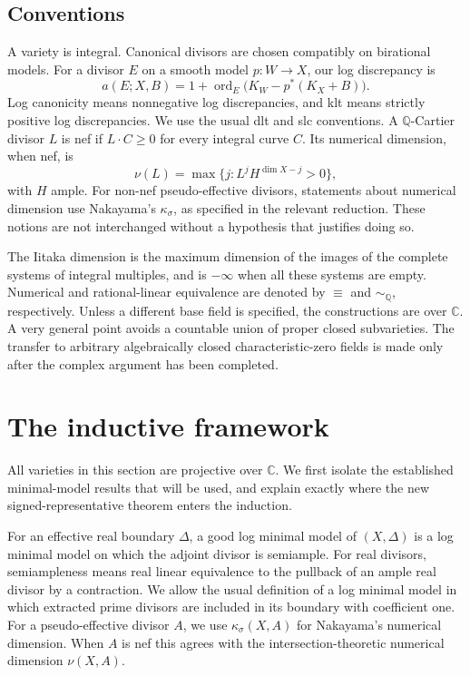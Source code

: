 \documentclass[11pt,letterpaper]{article}
\newcommand{\Q}{\mathbb{Q}}
\newcommand{\C}{\mathbb{C}}
\DeclareMathOperator{\ord}{ord}
\theoremstyle{definition}
\theoremstyle{remark}
\begin{document}
\subsection{Conventions}

A variety is integral. Canonical divisors are chosen compatibly on
birational models. For a divisor \(E\) on a smooth model
\(p:W\to X\), our log discrepancy is
\[
 a(E;X,B)=1+\ord_E\bigl(K_W-p^*(K_X+B)\bigr).
\]
Log canonicity means nonnegative log discrepancies, and klt means
strictly positive log discrepancies. We use the usual dlt and slc
conventions. A \(\Q\)-Cartier divisor \(L\) is nef if \(L\cdot C\ge0\)
for every integral curve \(C\). Its numerical dimension, when nef, is
\[
 \nu(L)=\max\{j: L^jH^{\dim X-j}>0\},
\]
with \(H\) ample. For non-nef pseudo-effective divisors, statements
about numerical dimension use Nakayama's \(\kappa_\sigma\), as
specified in the relevant reduction. These notions are not
interchanged without a hypothesis that justifies doing so.

The Iitaka dimension is the maximum dimension of the images of the
complete systems of integral multiples, and is \(-\infty\) when all
these systems are empty. Numerical and rational-linear equivalence
are denoted by \(\equiv\) and \(\sim_{\Q}\), respectively. Unless a
different base field is specified, the constructions are over \(\C\).
A very general point avoids a countable union of proper closed
subvarieties. The transfer to arbitrary algebraically closed
characteristic-zero fields is made only after the complex argument
has been completed.

\section{The inductive framework}\label{proj:sec:induction}

All varieties in this section are projective over \(\C\).
We first isolate the established minimal-model results that will be
used, and explain exactly where the new signed-representative theorem
enters the induction.

For an effective real boundary \(\Delta\), a good log minimal model of
\((X,\Delta)\) is a log minimal model on which the adjoint divisor is
semiample. For real divisors, semiampleness means real linear equivalence
to the pullback of an ample real divisor by a contraction. We allow the
usual definition of a log minimal model in which extracted prime
divisors are included in its boundary with coefficient one.
For a pseudo-effective divisor \(A\), we use
\(\kappa_\sigma(X,A)\) for Nakayama's numerical dimension. When \(A\)
is nef this agrees with the intersection-theoretic numerical dimension
\(\nu(X,A)\).
\end{document}
